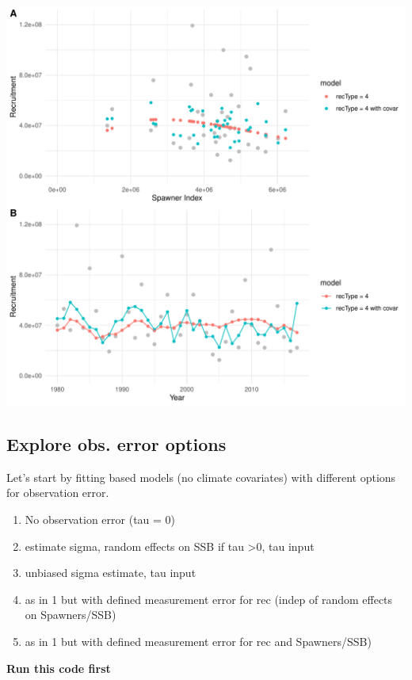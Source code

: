 \documentclass[
]{article}
\providecommand{\tightlist}{%
  \setlength{\itemsep}{0pt}\setlength{\parskip}{0pt}}
\begin{document}
\includegraphics{futR_demo_files/figure-latex/plotR4_cov-1.pdf}

\hypertarget{explore-obs.-error-options}{%
\subsection{Explore obs. error
options}\label{explore-obs.-error-options}}

Let's start by fitting based models (no climate covariates) with
different options for observation error.

\begin{enumerate}
\def\labelenumi{\arabic{enumi}.}
\tightlist
\item
  No observation error (tau = 0)
\item
  estimate sigma, random effects on SSB if tau \textgreater0, tau input
\item
  unbiased sigma estimate, tau input
\item
  as in 1 but with defined measurement error for rec (indep of random
  effects on Spawners/SSB)
\item
  as in 1 but with defined measurement error for rec and Spawners/SSB)
\end{enumerate}

\textbf{Run this code first}
\end{document}
